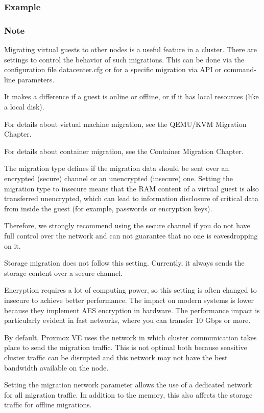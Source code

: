 \subsubsection{Example}

\subsubsection{Note}

Migrating virtual guests to other nodes is a useful feature in a cluster. There are settings to control the behavior of such migrations. This can be done via the configuration file datacenter.cfg or for a specific migration via API or command-line parameters.

It makes a difference if a guest is online or offline, or if it has local resources (like a local disk).

For details about virtual machine migration, see the QEMU/KVM Migration Chapter.

For details about container migration, see the Container Migration Chapter.

The migration type defines if the migration data should be sent over an encrypted (secure) channel or an unencrypted (insecure) one. Setting the migration type to insecure means that the RAM content of a virtual guest is also transferred unencrypted, which can lead to information disclosure of critical data from inside the guest (for example, passwords or encryption keys).

Therefore, we strongly recommend using the secure channel if you do not have full control over the network and can not guarantee that no one is eavesdropping on it.

Storage migration does not follow this setting. Currently, it always sends the storage content over a secure channel.

Encryption requires a lot of computing power, so this setting is often changed to insecure to achieve better performance. The impact on modern systems is lower because they implement AES encryption in hardware. The performance impact is particularly evident in fast networks, where you can transfer 10 Gbps or more.

By default, Proxmox VE uses the network in which cluster communication takes place to send the migration traffic. This is not optimal both because sensitive cluster traffic can be disrupted and this network may not have the best bandwidth available on the node.

Setting the migration network parameter allows the use of a dedicated network for all migration traffic. In addition to the memory, this also affects the storage traffic for offline migrations.

